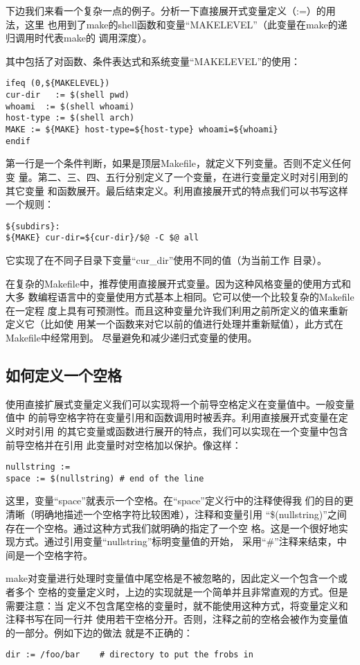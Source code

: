 下边我们来看一个复杂一点的例子。分析一下直接展开式变量定义（:=）的用法，这里
也用到了make的shell函数和变量“MAKELEVEL”（此变量在make的递归调用时代表make的
调用深度）。

其中包括了对函数、条件表达式和系统变量“MAKELEVEL”的使用：

\begin{Verbatim}[]
ifeq (0,${MAKELEVEL})
cur-dir   := $(shell pwd)
whoami  := $(shell whoami)
host-type := $(shell arch)
MAKE := ${MAKE} host-type=${host-type} whoami=${whoami}
endif
\end{Verbatim}

第一行是一个条件判断，如果是顶层Makefile，就定义下列变量。否则不定义任何变
量。第二、三、四、五行分别定义了一个变量，在进行变量定义时对引用到的其它变量
和函数展开。最后结束定义。利用直接展开式的特点我们可以书写这样一个规则：

\begin{Verbatim}[]
${subdirs}:
${MAKE} cur-dir=${cur-dir}/$@ -C $@ all
\end{Verbatim}
\noindent 它实现了在不同子目录下变量“cur\_dir”使用不同的值（为当前工作
目录）。

在复杂的Makefile中，推荐使用直接展开式变量。因为这种风格变量的使用方式和大多
数编程语言中的变量使用方式基本上相同。它可以使一个比较复杂的Makefile在一定程
度上具有可预测性。而且这种变量允许我们利用之前所定义的值来重新定义它（比如使
用某一个函数来对它以前的值进行处理并重新赋值），此方式在Makefile中经常用到。
尽量避免和减少递归式变量的使用。

\subsection{如何定义一个空格}
使用直接扩展式变量定义我们可以实现将一个前导空格定义在变量值中。一般变量值中
的前导空格字符在变量引用和函数调用时被丢弃。利用直接展开式变量在定义时对引用
的其它变量或函数进行展开的特点，我们可以实现在一个变量中包含前导空格并在引用
此变量时对空格加以保护。像这样：
\begin{Verbatim}[]
nullstring :=
space := $(nullstring) # end of the line
\end{Verbatim}

这里，变量“space”就表示一个空格。在“space”定义行中的注释使得我
们的目的更清晰（明确地描述一个空格字符比较困难），注释和变量引用
“\$(nullstring)”之间存在一个空格。通过这种方式我们就明确的指定了一个空
格。这是一个很好地实现方式。通过引用变量“nullstring”标明变量值的开始，
采用“\#”注释来结束，中间是一个空格字符。

make对变量进行处理时变量值中尾空格是不被忽略的，因此定义一个包含一个或者多个
空格的变量定义时，上边的实现就是一个简单并且非常直观的方式。但是需要注意：当
定义不包含尾空格的变量时，就不能使用这种方式，将变量定义和注释书写在同一行并
使用若干空格分开。否则，注释之前的空格会被作为变量值的一部分。例如下边的做法
就是不正确的：
\begin{Verbatim}[]
dir := /foo/bar    # directory to put the frobs in
\end{Verbatim}

